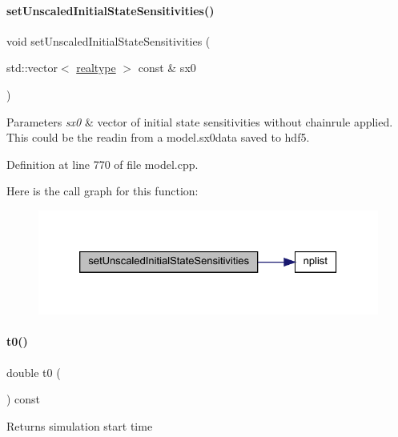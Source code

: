 \paragraph{\texorpdfstring{setUnscaledInitialStateSensitivities()}{setUnscaledInitialStateSensitivities()}}
{\footnotesize\ttfamily void set\+Unscaled\+Initial\+State\+Sensitivities (\begin{DoxyParamCaption}\item[{std\+::vector$<$ \mbox{\hyperlink{namespaceamici_a1bdce28051d6a53868f7ccbf5f2c14a3}{realtype}} $>$ const \&}]{sx0 }\end{DoxyParamCaption})}


\begin{DoxyParams}{Parameters}
{\em sx0} & vector of initial state sensitivities without chainrule applied. This could be the readin from a model.\+sx0data saved to hdf5. \\
\hline
\end{DoxyParams}


Definition at line 770 of file model.\+cpp.

Here is the call graph for this function\+:
\nopagebreak
\begin{figure}[H]
\begin{center}
\leavevmode
\includegraphics[width=326pt]{classamici_1_1_model_a55c3dcaac3e24e7b6ec3a80c7f148ed6_cgraph}
\end{center}
\end{figure}
\mbox{\label{classamici_1_1_model_a223e567004c82b5facc2fe98cdd16855}} 
\paragraph{\texorpdfstring{t0()}{t0()}}
{\footnotesize\ttfamily double t0 (\begin{DoxyParamCaption}{ }\end{DoxyParamCaption}) const}

\begin{DoxyReturn}{Returns}
simulation start time 
\end{DoxyReturn}


